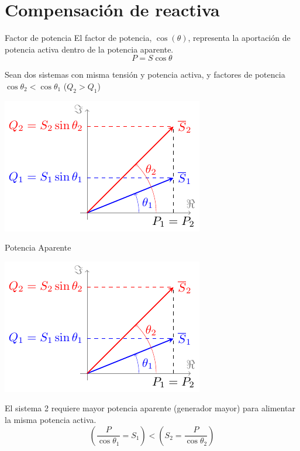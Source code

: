 \documentclass[aspectratio=169, usenames,svgnames,dvipsnames]{beamer}
\begin{document}
\section{Compensación de reactiva}
\label{sec:org3da7616}

\begin{frame}[label={sec:org343fb50}]{Factor de potencia}
El factor de potencia, \(\cos(\theta)\), representa la aportación de potencia activa dentro de la potencia aparente.
\[
P = S \cos \theta
\]

Sean dos sistemas con \alert{misma tensión y potencia activa}, y factores de potencia \(\cos \theta_2 < \cos \theta_1\) (\(Q_2 > Q_1\))

\begin{center}
\includegraphics[height=0.5\textheight]{../figs/Fasores_CompensacionReactiva.pdf}
\end{center}
\end{frame}

\begin{frame}[label={sec:orgddb72ed}]{Potencia Aparente}
\begin{center}
\includegraphics[height=0.5\textheight]{../figs/Fasores_CompensacionReactiva.pdf}
\end{center}


El sistema 2 requiere \alert{mayor potencia aparente} (generador mayor) para alimentar la misma potencia activa.
\[
  \left(\frac{P}{\cos \theta_1} = S_1 \right) < \left( S_2 = \frac{P}{\cos \theta_2}\right) 
\]
\end{frame}
\end{document}
